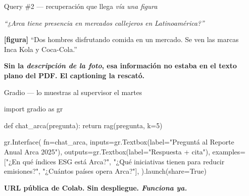 \documentclass[aspectratio=169, 11pt]{beamer}
\begin{document}
\begin{frame}[shrink]{Query \#2 --- recuperación que llega \emph{vía una figura}}
  \vspace{2pt}
  \begin{tcolorbox}[colback=arcaGray, colframe=codeBlue, leftrule=3pt,
    boxrule=0pt, sharp corners, left=8pt, right=8pt, top=4pt, bottom=4pt,
    title={\scriptsize\color{white}\bfseries Pregunta},
    coltitle=white, colbacktitle=codeBlue, fonttitle=\scriptsize]
    {\footnotesize\color{textDark}
    \itshape ``¿Arca tiene presencia en mercados callejeros en Latinoamérica?''}
  \end{tcolorbox}
  \vspace{4pt}
  \begin{tcolorbox}[colback=arcaGray, colframe=codeOrange, leftrule=3pt,
    boxrule=0pt, sharp corners, left=8pt, right=8pt, top=4pt, bottom=4pt,
    title={\scriptsize\color{white}\bfseries Top-1 recuperado},
    coltitle=white, colbacktitle=codeOrange, fonttitle=\scriptsize]
    {\scriptsize\color{textDark}
    \textbf{[figura]} ``Dos hombres disfrutando comida en un mercado. Se ven las
    marcas Inca Kola y Coca-Cola.''}
  \end{tcolorbox}
  \vspace{4pt}
  \begin{tcolorbox}[colback=arcaRed!8, colframe=arcaRed, leftrule=3pt,
    boxrule=0pt, sharp corners, left=8pt, right=8pt, top=4pt, bottom=4pt]
    {\footnotesize\color{arcaDark}\bfseries
    Sin la \emph{descripción de la foto}, esa información \textbf{no estaba
    en el texto plano del PDF}. El captioning la rescató.}
  \end{tcolorbox}
\end{frame}

\begin{frame}{Gradio --- lo muestras al supervisor el martes}
  \begin{pyblock}
import gradio as gr

def chat_arca(pregunta):
    return rag(pregunta, k=5)

gr.Interface(
    fn=chat_arca,
    inputs=gr.Textbox(label="Preguntá al Reporte Anual Arca 2025"),
    outputs=gr.Textbox(label="Respuesta + cita"),
    examples=["¿En qué índices ESG está Arca?",
              "¿Qué iniciativas tienen para reducir emisiones?",
              "¿Cuántos países opera Arca?"],
).launch(share=True)
  \end{pyblock}
  \vspace{4pt}
  \begin{tcolorbox}[colback=arcaRed!8, colframe=arcaRed, leftrule=3pt,
    boxrule=0pt, sharp corners, left=8pt, right=8pt, top=3pt, bottom=3pt]
    {\footnotesize\color{arcaDark}\bfseries
    URL pública de Colab. Sin despliegue. \emph{Funciona ya.}}
  \end{tcolorbox}
\end{frame}
\end{document}
